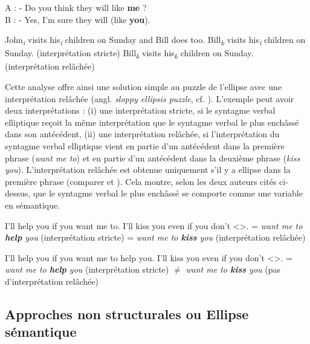 \ea \label{ch1:ex121}
A : - Do you think they will like \textbf{me} ? \\
B : - Yes, I’m sure they will (like \textbf{you}).  
\z

\ea John\textit{\textsubscript{i}} visits his\textit{\textsubscript{i}} children on Sunday and Bill does too. \label{ch1:ex122} 
\ea  Bill\textit{\textsubscript{k}} visits his\textit{\textsubscript{i}} children on Sunday. (interprétation stricte) 
\ex    Bill\textit{\textsubscript{k}} visits his\textit{\textsubscript{k}} children on Sunday. (interprétation relâchée)
\z
\z

Cette analyse offre ainsi une solution simple au puzzle de l’ellipse avec une interprétation relâchée (angl. \textit{sloppy ellipsis puzzle}, cf. \citealt{Hardt1999,Schwarz2000}). L’exemple  peut avoir deux interprétations : (i) une interprétation stricte, si le syntagme verbal elliptique reçoit la même interprétation que le syntagme verbal le plus enchâssé dans son antécédent, (ii) une interprétation relâchée, si l’interprétation du syntagme verbal elliptique vient en partie d’un antécédent dans la première phrase (\textit{want me to}) et en partie d’un antécédent dans la deuxième phrase (\textit{kiss you}). L’interprétation relâchée est obtenue uniquement s’il y a ellipse dans la première phrase (comparer  et ). Cela montre, selon les deux auteurs cités ci-dessus, que le syntagme verbal le plus enchâssé se comporte comme une variable en sémantique. 

\ea 
I’ll help you if you want me to. I’ll kiss you even if you don’t {\textless}{\textgreater}. \label{ch1:ex123} 
\ea  {\textless}{\textgreater} = \textit{want me to \textbf{help} you} (interprétation stricte) 
\ex    {\textless}{\textgreater} = \textit{want me to \textbf{kiss} you} (interprétation relâchée)
\z
\z

\ea 
I’ll help you if you want me to help you. I’ll kiss you even if you don’t {\textless}{\textgreater}. \label{ch1:ex124}  
\ea  {\textless}{\textgreater} = \textit{want me to \textbf{help} you} (interprétation stricte) 
\ex    {\textless}{\textgreater} ${\neq}$ \textit{want me to \textbf{kiss} you} (pas d’interprétation relâchée) 
\z
\z

 
\subsection{Approches non structurales ou Ellipse sémantique} \label{ch1:sect1.5.2}

